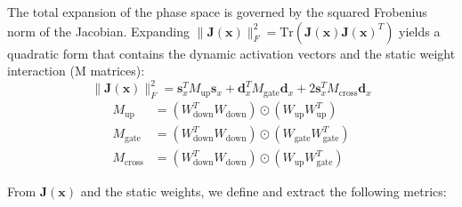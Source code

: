 \documentclass[a4paper,12pt]{article}
\begin{document}
    The total expansion of the phase space is governed by the squared Frobenius norm of the Jacobian. Expanding $\|\mathbf{J}(\mathbf{x})\|_F^2 = \text{Tr}(\mathbf{J}(\mathbf{x}) \mathbf{J}(\mathbf{x})^T)$ yields a quadratic form that contains the dynamic activation vectors and the static weight interaction (M matrices):
    \begin{equation} 
        \|\mathbf{J}(\mathbf{x})\|_F^2 = \mathbf{s}_x^T M_{\text{up}} \mathbf{s}_x + \mathbf{d}_x^T M_{\text{gate}} \mathbf{d}_x + 2 \mathbf{s}_x^T M_{\text{cross}} \mathbf{d}_x
    \end{equation}
    \begin{align} 
        M_{\text{up}}    &= (W_{\text{down}}^T W_{\text{down}}) \odot (W_{\text{up}} W_{\text{up}}^T) \\
        M_{\text{gate}}  &= (W_{\text{down}}^T W_{\text{down}}) \odot (W_{\text{gate}} W_{\text{gate}}^T) \\
        M_{\text{cross}} &= (W_{\text{down}}^T W_{\text{down}}) \odot (W_{\text{up}} W_{\text{gate}}^T)
    \end{align}
    
    From $\mathbf{J}(\mathbf{x})$ and the static weights, we define and extract the following metrics:
\end{document}
